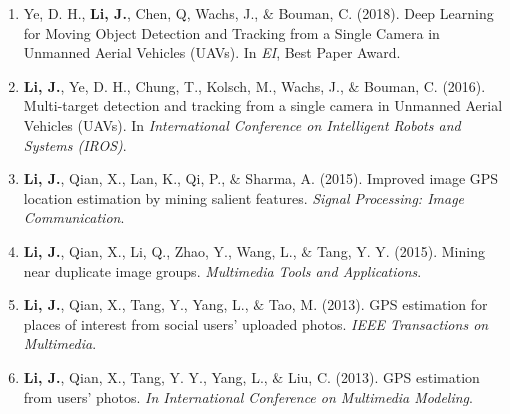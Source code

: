 \documentclass[10pt]{article}
\makeatletter
\newlength{\bibsep}
 {\@listi \global\bibsep\itemsep \global\advance\bibsep by\parsep}
\newenvironment{bibsection}[1][\enskip\textbullet]%
        {\begin{enumerate}[leftmargin=*,itemsep=\bibsep,parsep=\parsep,itemsep=0pt,topsep=0pt,partopsep=0pt]}
        {\end{enumerate}}
\makeatother
\begin{document}
\begin{bibsection}

\item  Ye, D. H., {\bf Li, J.}, Chen, Q, Wachs, J., $\&$ Bouman, C. (2018). Deep Learning for Moving Object Detection and Tracking from a Single Camera in Unmanned Aerial Vehicles (UAVs). In  \emph{ EI}, Best Paper Award.
\vspace{-.05in}

 	\item {\bf Li, J.}, Ye, D. H., Chung, T., Kolsch, M., Wachs, J., $\&$ Bouman, C. (2016). Multi-target detection and tracking from a single camera in Unmanned Aerial Vehicles (UAVs). In  \emph{ International Conference on Intelligent Robots and Systems (IROS)}.
\vspace{-.05in}


    \item {\bf Li, J.}, Qian, X., Lan, K., Qi, P., $\&$ Sharma, A. (2015). Improved image GPS location estimation by mining salient features. \emph{Signal Processing: Image Communication}.
\vspace{-.05in}

    \item {\bf  Li, J.}, Qian, X.,  Li, Q., Zhao, Y., Wang, L., $\&$ Tang, Y. Y. (2015). Mining near duplicate image groups. \emph{Multimedia Tools and Applications}.
\vspace{-.05in}


    \item {\bf  Li, J.}, Qian, X., Tang, Y., Yang, L., $\&$ Tao, M. (2013). GPS estimation for places of interest from social users' uploaded photos. \emph{ IEEE Transactions on Multimedia}.
\vspace{-.05in}

    \item {\bf  Li, J.}, Qian, X., Tang, Y. Y., Yang, L., $\&$  Liu, C. (2013). GPS estimation from users’ photos.\emph{ In International Conference on Multimedia Modeling}.
\vspace{-.05in}




\end{bibsection}
\end{document}
